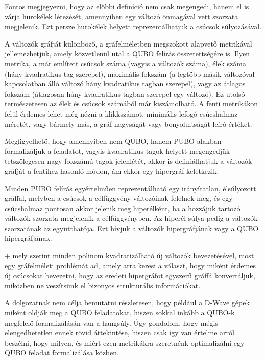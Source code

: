 Fontos megjegyezni, hogy az előbbi definíció nem csak megengedi, hanem el is várja hurokélek létezését, amennyiben egy változó önmagával vett szorzata megjelenik. Ezt persze hurokélek helyett reprezentálhatjuk a csúcsok súlyozásával.

A változók gráfját különböző, a gráfelméletben megszokott alapvető metrikával jellemezhetjük, amely közvetlenül utal a QUBO felírás összetettségére is. Ilyen metrika, a már említett csúcsok száma (vagyis a változók száma), élek száma (hány kvadratikus tag szerepel), maximális fokszám (a legtöbb másik változóval kapcsolatban álló változó hány kvadratikus tagban szerepel), vagy az átlagos fokszám (átlagosan hány kvadratikus tagban szerepel egy változó). Ez utolsó természetesen az élek és csúcsok számából már kiszámolható. A fenti metrikákon felül érdemes lehet még nézni a klikkszámot, minimális lefogó csúcshalmaz méretét, vagy bármely más, a gráf nagyságát vagy bonyolultságát leíró értéket.

Megfigyelhető, hogy amennyiben nem QUBO, hanem PUBO alakban formalizáljuk a feladatot, vagyis kvadratikus tagok helyett megengedjük tetszőlegesen nagy fokszámú tagok jelenlétét, akkor is definiálhatjuk a változók gráfját a fentihez hasonló módon, ám ekkor egy hipergráf keletkezik.

\begin{definition}\label{def:valtozokhipergrafja}
	Minden PUBO felírás egyértelműen reprezentálható egy irányítatlan, élsúlyozott gráffal, melyben a csúcsok a célfüggvény változóinak felelnek meg, és egy csúcshalmaz pontosan akkor jelenik meg hiperélként, ha a hozzájuk tartozó változók szorzata megjelenik a célfüggvényben. Az hiperél súlya pedig a változók szorzatának az együtthatója. Ezt hívjuk a változók hipergráfjának vagy a QUBO hipergráfjának.
\end{definition}

\Az+ mely szerint minden polinom kvadratizálható új változók bevezetésével, most egy gráfelméleti problémát ad, amely arra keresi a választ, hogy miként érdemes új csúcsokat bevezetni, hogy az eredeti hipergráfot egyszerű gráffá konvertáljuk, miközben ne veszítsünk el bizonyos strukturális információkat.


A dolgozatnak nem célja bemutatni részletesen, hogy például a D-Wave gépek miként oldják meg a QUBO feladatokat, hiszen sokkal inkább a QUBO-k megfelelő formalizálásán van a hangsúly. Úgy gondolom, hogy mégis elengedhetetlen ennek rövid áttekintése, hiszen csak így van értelme arról beszélni, hogy milyen, és miért ezen metrikákra szeretnénk optimalizálni egy QUBO feladat formalizálása közben.

